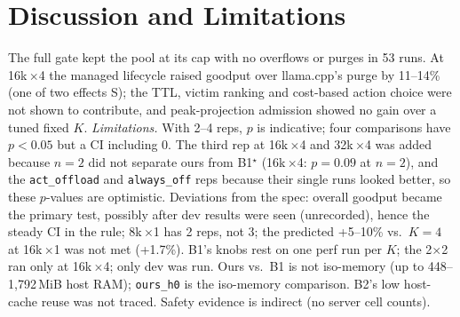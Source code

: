 \documentclass[conference]{IEEEtran}
\newcommand{\K}{$K$}
\newcommand{\x}{$\times$}
\newcommand{\pick}{$^\star$}
\newcommand{\cfg}[1]{\texttt{#1}}
\begin{document}
\section{Discussion and Limitations}\label{sec:disc}

The full gate kept the pool at its cap with no overflows or purges in 53 runs. At 16k\,\x4 the
managed lifecycle raised goodput over llama.cpp's purge by 11--14\% (one of two effects S);
the TTL, victim ranking and cost-based action choice were not shown to contribute, and
peak-projection admission showed no gain over a tuned fixed \K.
\emph{Limitations.} With 2--4 reps, $p$ is indicative; four comparisons have $p<0.05$ but a CI
including 0. The third rep at 16k\,\x4 and 32k\,\x4 was added because $n=2$ did not separate ours
from B1\pick{} (16k\,\x4: $p=0.09$ at $n=2$), and the \cfg{act\_offload} and \cfg{always\_off} reps
because their single runs looked better, so these $p$-values are optimistic. Deviations from the
spec: overall goodput became the primary test, possibly after dev results were seen
(unrecorded), hence the steady CI in the rule; 8k\,\x1 has 2 reps, not 3; the predicted +5--10\% vs.\
$K{=}4$ at 16k\,\x1 was not met (+1.7\%).
B1's knobs rest on one perf run per \K; the 2\x2 ran only at 16k\,\x4; only dev was run. Ours vs.\ B1 is not iso-memory (up to 448--1,792\,MiB host RAM); \cfg{ours\_h0} is the
iso-memory comparison. B2's low host-cache reuse was not traced. Safety evidence is indirect (no
server cell counts).

\onecolumn
{}
\vspace{4pt}
\end{document}
